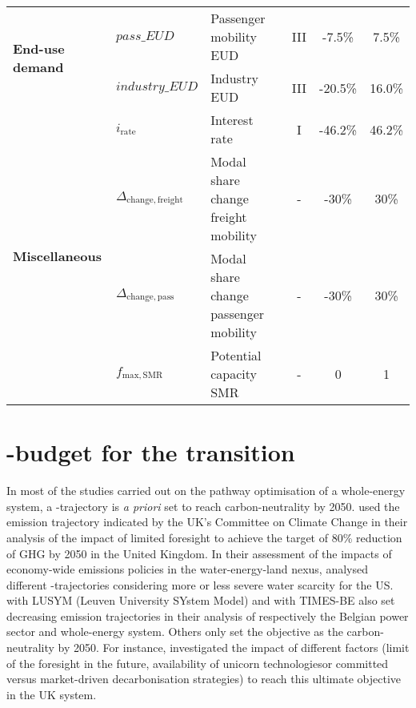 \begin{table}[htbp!]
{\begin{tabular}{l l l c c c}
\multirow{2}{*}{\textbf{End-use demand}} & $pass\_EUD$ & Passenger mobility EUD & III & -7.5\% & 7.5\% \\
& $industry\_EUD$ & Industry EUD & III & -20.5\% & 16.0\% \\
\midrule

\multirow{4}{*}{\textbf{Miscellaneous}} &$i_{\mathrm{rate}}$  & Interest rate & I & -46.2\% & 46.2\% \\
& $\Delta_{\mathrm{change,freight}}$ & Modal share change freight mobility & - & -30\% & 30\% \\
& $\Delta_{\mathrm{change,pass}}$ & Modal share change passenger mobility & - & -30\% & 30\% \\
& $f_{\mathrm{max,SMR}}$ & Potential capacity \gls{SMR} & - & 0 & 1 \\

\bottomrule							

\end{tabular}}
\end{table}

\section{-budget for the transition}
\label{sec:cs:CO2-budget}
In most of the studies carried out on the pathway optimisation of a whole-energy system, a -trajectory is \textit{a priori} set to reach carbon-neutrality by 2050. \citet{nerini2017myopic} used the emission trajectory indicated by the UK's Committee on Climate Change in their analysis of the impact of limited foresight to achieve the target of 80\% reduction of \gls{GHG} by 2050 in the United Kingdom. In their assessment of the impacts of economy-wide emissions policies in the water-energy-land nexus, \citet{licandeo2023assessing} analysed different -trajectories considering more or less severe water scarcity for the US. \citet{poncelet2016myopic} with LUSYM (Leuven University SYstem Model) and \citet{PATHS2050} with TIMES-BE also set decreasing emission trajectories in their analysis of respectively the Belgian power sector and whole-energy system.  Others only set the objective as the carbon-neutrality by 2050. For instance, \citet{heuberger2018impact} investigated the impact of different factors (\eg limit of the foresight in the future, availability of \og unicorn technologies\fg or committed versus market-driven decarbonisation strategies) to reach this ultimate objective in the UK system.\\

